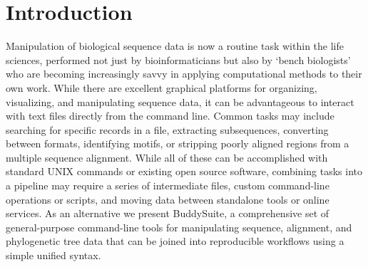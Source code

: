 \documentclass[nogrid]{MBE_article}%
\begin{document}
\section{{Introduction}\label{sec:Intro}}
Manipulation of biological sequence data is now a routine task within the life sciences, performed not just by bioinformaticians but also by `bench biologists' who are becoming increasingly savvy in applying computational methods to their own work. While there are excellent graphical platforms for organizing, visualizing, and manipulating sequence data, it can be advantageous to interact with text files directly from the command line. Common tasks may include searching for specific records in a file, extracting subsequences, converting between formats, identifying motifs, or stripping poorly aligned regions from a multiple sequence alignment. While all of these can be accomplished with standard UNIX commands or existing open source software, combining tasks into a pipeline may require a series of intermediate files, custom command-line operations or scripts, and moving data between standalone tools or online services. As an alternative we present BuddySuite, a comprehensive set of general-purpose command-line tools for manipulating sequence, alignment, and phylogenetic tree data that can be joined into reproducible workflows using a simple unified syntax.
\end{document}
